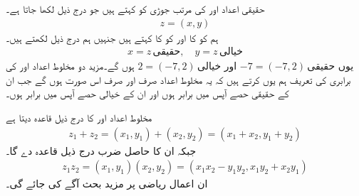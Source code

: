 حقیقی اعداد  اور  کی مرتب جوڑی  کو   کہتے ہیں جو درج ذیل لکھا جاتا ہے۔
\begin{align*}
z=(x,y)
\end{align*}
ہم  کو  کا  اور  کو  کا  کہتے ہیں جنہیں ہم درج ذیل لکھتے ہیں۔
\begin{align*}
x=z\,\text{حقیقی},\quad y=z\,\text{خیالی}
\end{align*}
یوں 
$-7=(-7,2)\,\text{حقیقی}$
اور 
$2=(-7,2)\,\text{خیالی}$
ہوں گے۔مزید دو مخلوط اعداد  اور  کی برابری کی تعریف ہم یوں کرتے ہیں کہ یہ مخلوط اعداد صرف اور صرف اس صورت  ہوں گے جب ان کے حقیقی حصے آپس میں برابر ہوں اور ان کے خیالی حصے آپس میں برابر ہوں۔ 

مخلوط اعداد  اور  کا   درج ذیل قاعدہ دیتا ہے
\begin{align}\label{مساوات_مخلوط_مجموعہ_اعداد}
z_1+z_2=(x_1,y_1)+(x_2,y_2)=(x_1+x_2,y_1+y_2)
\end{align}
جبکہ ان کا حاصل ضرب درج ذیل قاعدہ دے گا۔
\begin{align}\label{مساوات_مخلوط_ضرب_اعداد}
z_1z_2=(x_1,y_1)(x_2,y_2)=(x_1x_2-y_1y_2,x_1y_2+x_2y_1)
\end{align}
ان اعمال ریاضی پر مزید بحث آگے کی جائے گی۔ 

